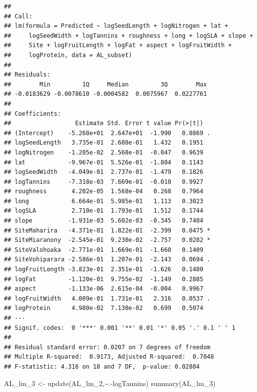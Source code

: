 \documentclass[
  12pt,
]{article}
\newenvironment{Shaded}{\begin{snugshade}}{\end{snugshade}}
\newcommand{\FunctionTok}[1]{\textcolor[rgb]{0.00,0.00,0.00}{#1}}
\newcommand{\NormalTok}[1]{#1}
\newcommand{\OtherTok}[1]{\textcolor[rgb]{0.56,0.35,0.01}{#1}}
\newcommand{\SpecialCharTok}[1]{\textcolor[rgb]{0.00,0.00,0.00}{#1}}
\begin{document}
\begin{verbatim}
## 
## Call:
## lm(formula = Predicted ~ logSeedLength + logNitrogen + lat + 
##     logSeedWidth + logTannins + roughness + long + logSLA + slope + 
##     Site + logFruitLength + logFat + aspect + logFruitWidth + 
##     logProtein, data = AL_subset)
## 
## Residuals:
##        Min         1Q     Median         3Q        Max 
## -0.0183629 -0.0078610 -0.0004582  0.0075967  0.0227761 
## 
## Coefficients:
##                  Estimate Std. Error t value Pr(>|t|)  
## (Intercept)    -5.268e+01  2.647e+01  -1.990   0.0869 .
## logSeedLength   3.735e-01  2.608e-01   1.432   0.1951  
## logNitrogen    -1.205e-02  2.568e-01  -0.047   0.9639  
## lat            -9.967e-01  5.526e-01  -1.804   0.1143  
## logSeedWidth   -4.049e-01  2.737e-01  -1.479   0.1826  
## logTannins     -7.318e-03  7.669e-01  -0.010   0.9927  
## roughness       4.202e-05  1.568e-04   0.268   0.7964  
## long            6.664e-01  5.985e-01   1.113   0.3023  
## logSLA          2.710e-01  1.793e-01   1.512   0.1744  
## slope          -1.931e-03  5.602e-03  -0.345   0.7404  
## SiteMaharira   -4.371e-01  1.822e-01  -2.399   0.0475 *
## SiteMiaranony  -2.545e-01  9.230e-02  -2.757   0.0282 *
## SiteValohoaka  -2.771e-01  1.669e-01  -1.660   0.1409  
## SiteVohiparara -2.586e-01  1.207e-01  -2.143   0.0694 .
## logFruitLength -3.823e-01  2.351e-01  -1.626   0.1480  
## logFat         -1.120e-01  9.755e-02  -1.149   0.2885  
## aspect         -1.133e-06  2.615e-04  -0.004   0.9967  
## logFruitWidth   4.009e-01  1.731e-01   2.316   0.0537 .
## logProtein      4.980e-02  7.130e-02   0.699   0.5074  
## ---
## Signif. codes:  0 '***' 0.001 '**' 0.01 '*' 0.05 '.' 0.1 ' ' 1
## 
## Residual standard error: 0.0207 on 7 degrees of freedom
## Multiple R-squared:  0.9173, Adjusted R-squared:  0.7048 
## F-statistic: 4.316 on 18 and 7 DF,  p-value: 0.02804
\end{verbatim}

\begin{Shaded}
\begin{Highlighting}[]
\NormalTok{AL\_lm\_3 }\OtherTok{\textless{}{-}} \FunctionTok{update}\NormalTok{(AL\_lm\_2,}\SpecialCharTok{\textasciitilde{}}\NormalTok{.}\SpecialCharTok{{-}}\NormalTok{logTannins)}
\FunctionTok{summary}\NormalTok{(AL\_lm\_3)}
\end{Highlighting}
\end{Shaded}
\end{document}

